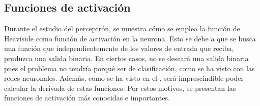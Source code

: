 		\subsection{Funciones de activación}
		
			Durante el estudio del perceptrón, se muestra cómo se emplea la función de Heaviside como función de activación en la neurona. Esto se debe a que se busca una función que independientemente de los valores de entrada que reciba, produzca una salida binaria. En ciertos casos, no se deseará una salida binaria pues el problema no tendría porqué ser de clasificación, como se ha visto con las redes neuronales. Además, como se ha visto en el , será imprescindible poder calcular la derivada de estas funciones. Por estos motivos, se presentan las funciones de activación más conocidas e importantes\cite{funcionesActivacion}. 
			
